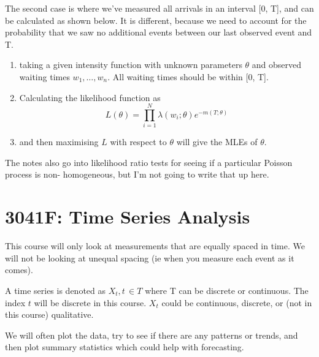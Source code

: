 \documentclass[12pt]{article}
\begin{document}
    The second case is where we've measured all arrivals in an interval [0, T], and can be 
    calculated as shown below. It is different, because we need to account for the probability that 
    we saw no additional events between our last observed event and T.
    \begin{enumerate}
        \item taking a given intensity function with unknown parameters \(\theta\) and observed waiting times \(w_1, \dots, w_n\). All waiting times should be within [0, T].
        \item Calculating the likelihood function as 
            \begin{equation*}
                L(\theta) = \prod_{i=1}^{N}\lambda(w_i; \theta) e^{-m(T; \theta)}
            \end{equation*}
        \item and then maximising \(L\) with respect to \(\theta\) will give the MLEs of \(\theta\).
    \end{enumerate}

    The notes also go into likelihood ratio tests for seeing if a particular Poisson process is non-
    homogeneous, but I'm not going to write that up here.

\section{3041F: Time Series Analysis}
    This course will only look at measurements that are equally spaced in time. We will not be looking at unequal spacing (ie when you measure each event as it comes).

    A time series is denoted as \(X_t, t \, \in T\) where T can be discrete or continuous.\newline
    The index \(t\) will be discrete in this course.
    \(X_t\) could be continuous, discrete, or (not in this course) qualitative. \newline \newline

    We will often plot the data, try to see if there are any patterns or trends, and then plot summary statistics which could help with forecasting.
\end{document}
